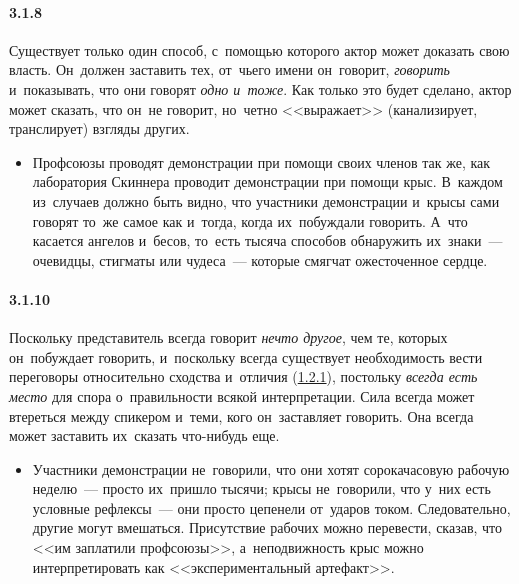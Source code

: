\paragraph{3.1.8}\hypertarget{par:3.1.8}{} Существует только один способ, с~помощью которого актор может доказать свою власть. Он~должен заставить тех, от~чьего имени он~говорит, {\itshape говорить} и~показывать, что они говорят {\itshape одно и~тоже}. Как только это будет сделано, актор может сказать, что он~не говорит, но~четно <<выражает>> (канализирует, транслирует) взгляды других. 
	\begin{itemize}
	\item 
	Профсоюзы проводят демонстрации при помощи своих членов так же, как лаборатория Скиннера проводит демонстрации при помощи крыс. В~каждом из~случаев должно быть видно, что участники демонстрации и~крысы сами говорят то~же самое как и~тогда, когда их~побуждали говорить. А~что касается ангелов и~бесов, то~есть тысяча способов обнаружить их~знаки~--- очевидцы, стигматы или чудеса~--- которые смягчат  ожесточенное сердце.
	\end{itemize}


\paragraph{3.1.10}\hypertarget{par:3.1.10}{} Поскольку представитель всегда говорит {\itshape нечто другое}, чем те, которых он~побуждает говорить, и~поскольку всегда существует необходимость вести переговоры относительно сходства и~отличия (\hyperlink{par:1.2.1}{1.2.1}), постольку {\itshape всегда есть место} для спора о~правильности всякой интерпретации. Сила всегда может втереться между спикером и~теми, кого он~заставляет говорить. Она всегда может заставить их~сказать что-нибудь еще. 
	\begin{itemize}
	\item 
	Участники демонстрации не~говорили, что они хотят сорокачасовую рабочую неделю~--- просто их~пришло тысячи; крысы не~говорили, что у~них есть условные рефлексы~--- они просто цепенели от~ударов током. Следовательно, другие могут вмешаться. Присутствие рабочих можно перевести, сказав, что <<им заплатили профсоюзы>>, а~неподвижность крыс можно интерпретировать как <<экспериментальный артефакт>>.
	\end{itemize}

